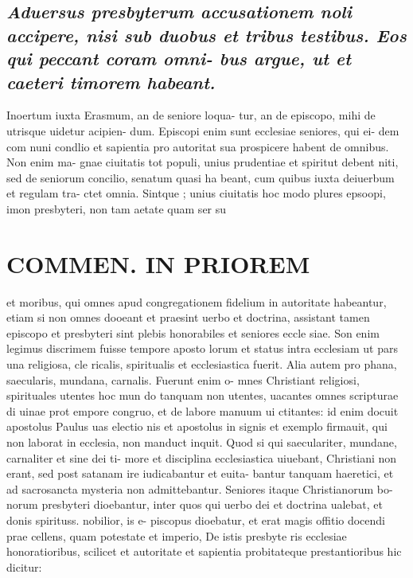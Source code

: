 \documentclass{article}
\begin{document}
\begin{pages}
\subsection*{\textit{Aduersus presbyterum accusationem noli accipere, nisi sub duobus et tribus testibus. Eos qui peccant coram omni- bus argue, ut et caeteri timorem habeant. }}\pstart Inoertum iuxta Erasmum, an de seniore loqua- tur, an de episcopo, mihi de utrisque uidetur acipien- dum. Episcopi enim sunt ecclesiae seniores, qui ei- dem com nuni condlio et sapientia pro autoritat sua prospicere habent de omnibus. Non enim ma- gnae ciuitatis tot populi, unius prudentiae et spiritut debent niti, sed de seniorum concilio, senatum quasi ha beant, cum quibus iuxta deiuerbum et regulam tra- ctet omnia. Sintque ; unius ciuitatis hoc modo plures epsoopi, imon presbyteri, non tam aetate quam ser su  \pend
\section*{COMMEN. IN PRIOREM }
\marginpar{[ p.142 ]}\pstart et moribus, qui omnes apud congregationem fidelium in autoritate habeantur, etiam si non omnes dooeant et praesint uerbo et doctrina, assistant tamen episcopo et presbyteri sint plebis honorabiles et seniores eccle siae. Son enim legimus discrimem fuisse tempore aposto lorum et status intra ecclesiam ut pars una religiosa, cle ricalis, spiritualis et ecclesiastica fuerit. Alia autem pro phana, saecularis, mundana, carnalis. Fuerunt enim o- mnes Christiant religiosi, spirituales utentes hoc mun do tanquam non utentes, uacantes omnes scripturae di uinae prot empore congruo, et de labore manuum ui ctitantes: id enim docuit apostolus Paulus uas electio nis et apostolus in signis et exemplo firmauit, qui non laborat in ecclesia, non manduct inquit. Quod si qui saeculariter, mundane, carnaliter et sine dei ti- more et disciplina ecclesiastica uiuebant, Christiani non erant, sed post satanam ire iudicabantur et euita- bantur tanquam haeretici, et ad sacrosancta mysteria non admittebantur. Seniores itaque Christianorum bo- norum presbyteri dioebantur, inter quos qui uerbo dei et doctrina ualebat, et donis spirituss. nobilior, is e- piscopus dioebatur, et erat magis offitio docendi prae cellens, quam potestate et imperio, De istis presbyte ris ecclesiae honoratioribus, scilicet et autoritate et sapientia probitateque prestantioribus hic dicitur:  \pend

\end{pages}
\end{document}
